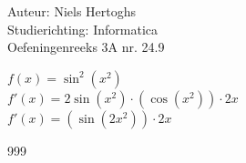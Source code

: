 \documentclass[a4paper]{article}
\begin{document}
  
\noindent \large Auteur: Niels Hertoghs \\
\noindent \large Studierichting: Informatica\\
\noindent \large Oefeningenreeks 3A nr. 24.9\\

\medskip

\normalsize

$f(x) = \sin^2 (x^2)$\\

$f'(x) = 2 \sin(x^2) \cdot (\cos (x^2)) \cdot 2x$\\

$f'(x) = (\sin (2x^2)) \cdot 2x$\\

\begin{thebibliography}{999}
\end{thebibliography}
\end{document}
